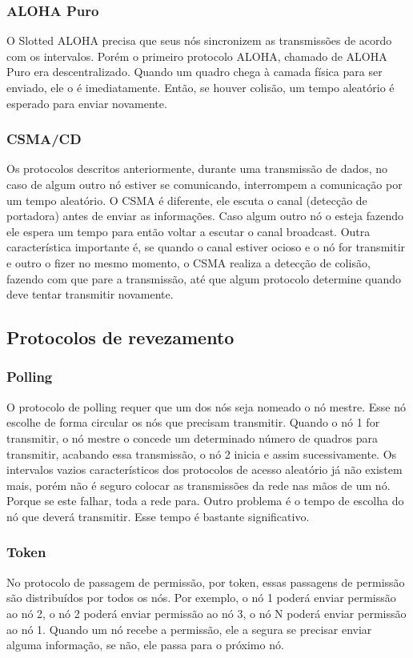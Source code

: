 \documentclass[12pt]{article}
\begin{document}
\subsubsection{ALOHA Puro}
O Slotted ALOHA precisa que seus nós sincronizem as transmissões de acordo com os intervalos. Porém o primeiro protocolo ALOHA, chamado de ALOHA Puro era descentralizado. Quando um quadro chega à camada física para ser enviado, ele o é imediatamente. Então, se houver colisão, um tempo aleatório é esperado para enviar novamente.

\subsubsection{CSMA/CD}
Os protocolos descritos anteriormente, durante uma transmissão de dados, no caso de algum outro nó estiver se comunicando, interrompem a comunicação por um tempo aleatório. O CSMA é diferente, ele escuta o canal (detecção de portadora) antes de enviar as informações. Caso algum outro nó o esteja fazendo ele espera um tempo para então voltar a escutar o canal broadcast. Outra característica importante é, se quando o canal estiver ocioso e o nó for transmitir e outro o fizer no mesmo momento, o CSMA realiza a detecção de colisão, fazendo com que pare a transmissão, até que algum protocolo determine quando deve tentar transmitir novamente.


\subsection{Protocolos de revezamento}
\subsubsection{Polling}
O protocolo de polling requer que um dos nós seja nomeado o nó mestre. Esse nó escolhe de forma circular os nós que precisam transmitir. Quando o nó 1 for transmitir, o nó mestre o concede um determinado número de quadros para transmitir, acabando essa transmissão, o nó 2 inicia e assim sucessivamente. Os intervalos vazios característicos dos protocolos de acesso aleatório já não existem mais, porém não é seguro colocar as transmissões da rede nas mãos de um nó. Porque se este falhar, toda a rede para. Outro problema é o tempo de escolha do nó que deverá transmitir. Esse tempo é bastante significativo.

\subsubsection{Token}
No protocolo de passagem de permissão, por token, essas passagens de permissão são distribuídos por todos os nós. Por exemplo, o nó 1 poderá enviar permissão ao nó 2, o nó 2 poderá enviar permissão ao nó 3, o nó N poderá enviar permissão ao nó 1. Quando um nó recebe a permissão, ele a segura se precisar enviar alguma informação, se não, ele passa para o próximo nó.
\end{document}
